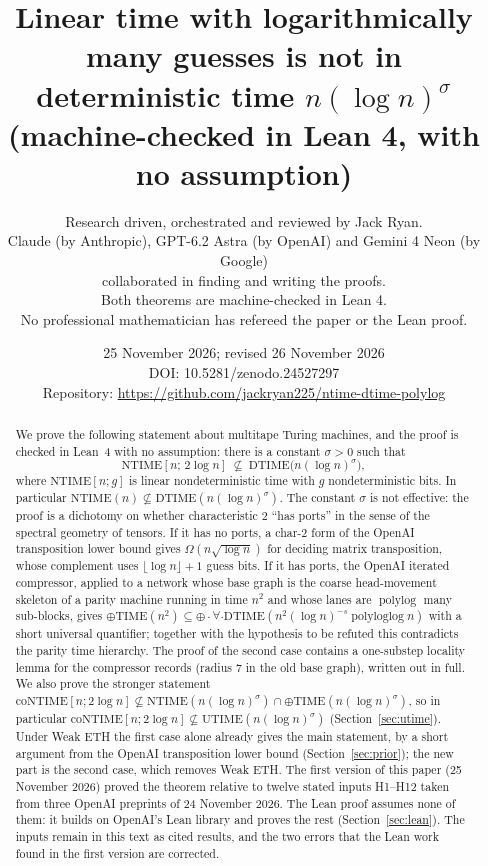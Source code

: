 \documentclass[11pt]{article}
\title{Linear time with logarithmically many guesses is not in\\ deterministic time $n(\log n)^{\sigma}$\\[4pt]
\large (machine-checked in Lean 4, with no assumption)}
\author{Research driven, orchestrated and reviewed by Jack Ryan.\\
Claude (by Anthropic), GPT-6.2 Astra (by OpenAI) and Gemini 4 Neon (by Google)\\
collaborated in finding and writing the proofs.\\
Both theorems are machine-checked in Lean 4.\\
No professional mathematician has refereed the paper or the Lean proof.}
\date{25 November 2026; revised 26 November 2026\\
DOI: 10.5281/zenodo.24527297\\
Repository: \url{https://github.com/jackryan225/ntime-dtime-polylog}}
\theoremstyle{definition}
\theoremstyle{remark}
\newcommand{\DTIME}{\mathrm{DTIME}}
\newcommand{\NTIME}{\mathrm{NTIME}}
\newcommand{\coNTIME}{\mathrm{coNTIME}}
\newcommand{\parTIME}{\oplus\mathrm{TIME}}
\begin{document}
\maketitle

\begin{abstract}
We prove the following statement about multitape Turing machines, and the proof is checked in Lean~4 with no assumption:
there is a constant $\sigma>0$ such that
\[
  \NTIME[n;\,2\log n]\ \not\subseteq\ \DTIME\bigl(n(\log n)^{\sigma}\bigr),
\]
where $\NTIME[n;g]$ is linear nondeterministic time with $g$ nondeterministic bits. In particular
$\NTIME(n)\not\subseteq\DTIME(n(\log n)^{\sigma})$. The constant $\sigma$ is not effective: the proof is a dichotomy on whether
characteristic $2$ ``has ports'' in the sense of the spectral geometry of tensors. If it has no ports, a char-$2$ form of the
OpenAI transposition lower bound gives $\Omega(n\sqrt{\log n})$ for deciding matrix transposition, whose complement uses
$\lfloor\log n\rfloor+1$ guess bits. If it has ports, the OpenAI iterated compressor, applied to a network whose base graph is the
coarse head-movement skeleton of a parity machine running in time $n^2$ and whose lanes are $\operatorname{polylog}$ many sub-blocks,
gives $\parTIME(n^2)\subseteq\oplus\cdot\forall\cdot\DTIME(n^2(\log n)^{-s}\operatorname{polyloglog}n)$ with a short
universal quantifier; together with the hypothesis to be refuted this contradicts the parity time hierarchy.
The proof of the second case contains a one-substep locality lemma for the compressor records (radius $7$ in the old base
graph), written out in full. We also prove the stronger statement
$\coNTIME[n;2\log n]\not\subseteq\NTIME(n(\log n)^{\sigma})\cap\parTIME(n(\log n)^{\sigma})$, so in particular
$\coNTIME[n;2\log n]\not\subseteq\mathrm{UTIME}(n(\log n)^{\sigma})$ (Section~\ref{sec:utime}). Under Weak ETH the first case alone
already gives the main statement, by a short argument from the OpenAI transposition lower bound (Section~\ref{sec:prior}); the
new part is the second case, which removes Weak ETH. The first version of this paper (25 November 2026) proved the theorem
relative to twelve stated inputs H1--H12 taken from three OpenAI preprints of 24 November 2026. The Lean proof assumes none
of them: it builds on OpenAI's Lean library and proves the rest (Section~\ref{sec:lean}). The inputs remain in this text as
cited results, and the two errors that the Lean work found in the first version are corrected.
\end{abstract}
\end{document}
